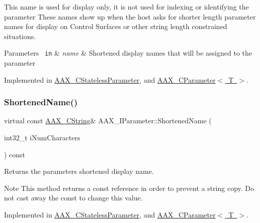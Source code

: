 This name is used for display only, it is not used for indexing or identifying the parameter These names show up when the host asks for shorter length parameter names for display on Control Surfaces or other string length constrained situations.


\begin{DoxyParams}[1]{Parameters}
\mbox{\texttt{ in}}  & {\em name} & Shortened display names that will be assigned to the parameter \\
\hline
\end{DoxyParams}


Implemented in \mbox{\hyperlink{a01541_a332e391a496d741f0f86ee7e46dbe6a4}{A\+A\+X\+\_\+\+C\+Stateless\+Parameter}}, and \mbox{\hyperlink{a01537_aa4f22a15a2e73048b602e7f81db37cb4}{A\+A\+X\+\_\+\+C\+Parameter$<$ T $>$}}.

\mbox{\label{a01857_a729ead00bf12103793557f39a01f782c}} 
\subsubsection{\texorpdfstring{ShortenedName()}{ShortenedName()}}
{\footnotesize\ttfamily virtual const \mbox{\hyperlink{a01573}{A\+A\+X\+\_\+\+C\+String}}\& A\+A\+X\+\_\+\+I\+Parameter\+::\+Shortened\+Name (\begin{DoxyParamCaption}\item[{int32\+\_\+t}]{i\+Num\+Characters }\end{DoxyParamCaption}) const\hspace{0.3cm}{\ttfamily [pure virtual]}}



Returns the parameter\textquotesingle{}s shortened display name. 

\begin{DoxyNote}{Note}
This method returns a const reference in order to prevent a string copy. Do not cast away the const to change this value. 
\end{DoxyNote}


Implemented in \mbox{\hyperlink{a01541_a2cf8f9e426e01d3eabea95447e856c23}{A\+A\+X\+\_\+\+C\+Stateless\+Parameter}}, and \mbox{\hyperlink{a01537_a3a804fb1ba33f9b748294bc868915813}{A\+A\+X\+\_\+\+C\+Parameter$<$ T $>$}}.

\mbox{\label{a01857_ae8601be6754169f626269f81f38b4581}} 
